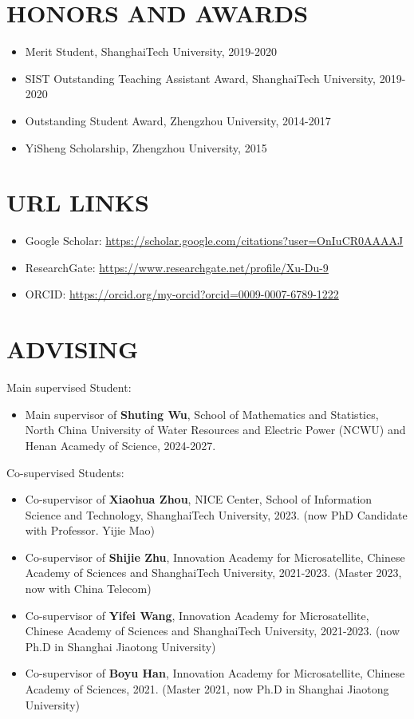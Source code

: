 \documentclass[paper=a4,fontsize=11pt]{scrartcl} %
\newcommand{\sepspace}{\vspace*{1em}}		%
\newcommand{\NewPart}[1]{\section*{\uppercase{#1}}}
\newcommand{\EducationEntry}[4]{
		\noindent \textbf{#1} \hfill      %
		\colorbox{White}{%
			\parbox{5cm}{%
			\hfill\color{Black}#2}} \par  %
		\noindent \textit{#3} \par        %
		\noindent\hangindent=2em\hangafter=0 \small #4 %
		\normalsize \par}
\begin{document}
\NewPart{HONORS AND AWARDS}
\begin{itemize}
	\item Merit Student, ShanghaiTech University, 2019-2020
	
	\item SIST Outstanding Teaching Assistant Award, ShanghaiTech University, 2019-2020
		
	
	\item Outstanding Student Award, Zhengzhou University, 2014-2017
	
	\item YiSheng Scholarship, Zhengzhou University, 2015
	
	
	\end{itemize}
%
\NewPart{URL Links}
\begin{itemize}
	\item Google Scholar: \url{https://scholar.google.com/citations?user=OnIuCR0AAAAJ}
	\item ResearchGate: \url{https://www.researchgate.net/profile/Xu-Du-9}
	\item ORCID: \url{https://orcid.org/my-orcid?orcid=0009-0007-6789-1222}
\end{itemize}

\NewPart{Advising}

Main supervised Student:
\begin{itemize}
		\item Main supervisor of \textbf{Shuting Wu}, School of Mathematics and Statistics, North China University of Water Resources and Electric Power (NCWU) and Henan Acamedy of Science, 2024-2027. 
\end{itemize}

Co-supervised Students:
\begin{itemize}
	
	
	\item Co-supervisor of \textbf{Xiaohua Zhou}, NICE Center, School of Information Science and
	Technology, ShanghaiTech University, 2023. (now PhD Candidate with Professor.
	Yijie Mao)
	
	\item Co-supervisor of \textbf{Shijie Zhu}, Innovation Academy for Microsatellite, Chinese Academy
	of Sciences and ShanghaiTech University, 2021-2023. (Master 2023, now with China
	Telecom)
	
	
	\item Co-supervisor of \textbf{Yifei Wang}, Innovation Academy for Microsatellite, Chinese
	Academy of Sciences and ShanghaiTech University, 2021-2023. (now Ph.D in Shanghai Jiaotong University)
	
	\item Co-supervisor of \textbf{Boyu Han}, Innovation Academy for Microsatellite, Chinese Academy
	of Sciences, 2021. (Master 2021, now Ph.D in Shanghai Jiaotong University)
\end{itemize}
\end{document}
